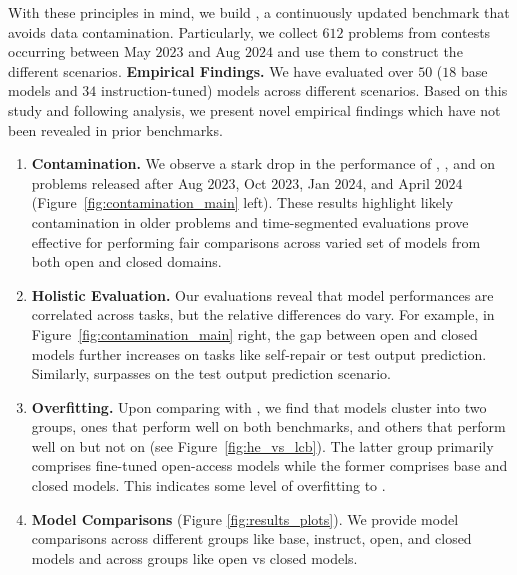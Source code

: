 
\vspace{-3pt}
\noindent With these principles in mind, we build \livecodebench{}, a continuously updated benchmark that avoids data contamination.
Particularly, we collect $612$ problems from contests occurring between May $2023$ and Aug $2024$ and use them to construct the different scenarios. 
\newline
\newline
\noindent \textbf{Empirical Findings.} 
We have evaluated over $50$ ($18$ base models and $34$ instruction-tuned) models across different \livecodebench{} scenarios.
Based on this study and following analysis, we present novel empirical findings which have not been revealed in prior benchmarks.
\vspace{-3pt}
\begin{enumerate}
\itemsep-0.05em 
    \item \textbf{Contamination.} 
    We observe a stark drop in the performance of \deepseek{}, \gptfouro{}, \codestral{} and \claudethrees{}  on \leetcode{} problems released after Aug $2023$, Oct $2023$, Jan $2024$, and April $2024$ (Figure~\ref{fig:contamination_main} left). These results highlight likely contamination in older problems and time-segmented evaluations 
    prove effective for performing fair comparisons across varied set of models from both open and closed domains.
    
    \item \textbf{Holistic Evaluation.} 
    Our evaluations reveal that model performances are correlated across tasks, but the relative differences do vary. 
    For example, in Figure~\ref{fig:contamination_main} right, the gap between open and closed models further increases on tasks like self-repair or test output prediction. 
    Similarly, \claudeopus{} surpasses \gptfour{} on the test output prediction scenario. %
    
    \item \textbf{\humaneval{} Overfitting.} 
    Upon comparing \livecodebench{} with \humaneval{}, we find that models cluster into two groups, ones that perform well on both benchmarks, and others that perform well on \humaneval{} but not on \livecodebench{} (see Figure~\ref{fig:he_vs_lcb}).
    The latter group primarily comprises fine-tuned open-access models while the former comprises base and closed models.
    This indicates some level of overfitting to \humaneval{}. %

    
    \item \textbf{Model Comparisons} (Figure \ref{fig:results_plots}). We provide model comparisons across different groups like base, instruct, open, and closed models and across groups like open vs closed models.
\end{enumerate}

